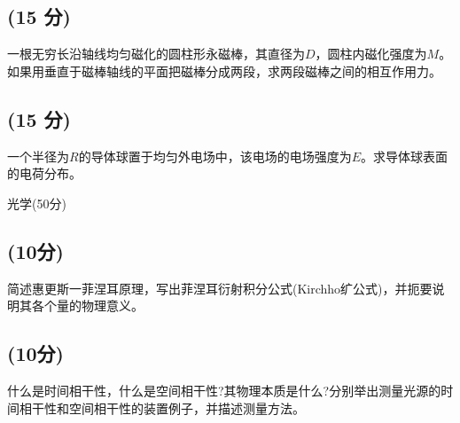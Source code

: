 \subsection{(15 分)}
一根无穷长沿轴线均匀磁化的圆柱形永磁棒，其直径为$D$，圆柱内磁化强度为$M$。如果用垂直于磁棒轴线的平面把磁棒分成两段，求两段磁棒之间的相互作用力。
\subsection{(15 分)}
一个半径为$R$的导体球置于均匀外电场中，该电场的电场强度为$E$。求导体球表面的电荷分布。

光学(50分)

\subsection{(10分)}
简述惠更斯一菲涅耳原理，写出菲涅耳衍射积分公式(Kirchho纩公式)，并扼要说明其各个量的物理意义。
\subsection{(10分)}
什么是时间相干性，什么是空间相干性?其物理本质是什么?分别举出测量光源的时间相干性和空间相干性的装置例子，并描述测量方法。
